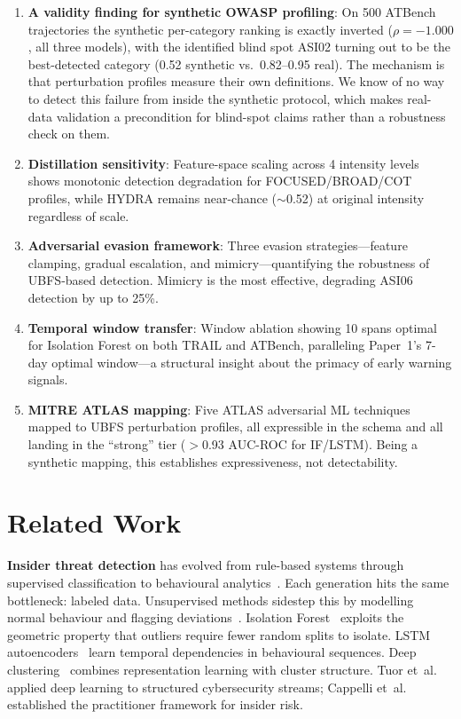 \documentclass[conference]{IEEEtran}
\begin{document}
\begin{enumerate}
    \item \textbf{A validity finding for synthetic OWASP profiling}: On 500 ATBench trajectories the synthetic per-category ranking is exactly inverted ($\rho = -1.000$, all three models), with the identified blind spot ASI02 turning out to be the best-detected category (0.52 synthetic vs.\ 0.82--0.95 real). The mechanism is that perturbation profiles measure their own definitions. We know of no way to detect this failure from inside the synthetic protocol, which makes real-data validation a precondition for blind-spot claims rather than a robustness check on them.
    \item \textbf{Distillation sensitivity}: Feature-space scaling across 4 intensity levels shows monotonic detection degradation for FOCUSED/BROAD/COT profiles, while HYDRA remains near-chance (${\sim}$0.52) at original intensity regardless of scale.
    \item \textbf{Adversarial evasion framework}: Three evasion strategies---feature clamping, gradual escalation, and mimicry---quantifying the robustness of UBFS-based detection. Mimicry is the most effective, degrading ASI06 detection by up to 25\%.
    \item \textbf{Temporal window transfer}: Window ablation showing 10 spans optimal for Isolation Forest on both TRAIL and ATBench, paralleling Paper~1's 7-day optimal window---a structural insight about the primacy of early warning signals.
    \item \textbf{MITRE ATLAS mapping}: Five ATLAS adversarial ML techniques mapped to UBFS perturbation profiles, all expressible in the schema and all landing in the ``strong'' tier ($>$0.93 AUC-ROC for IF/LSTM). Being a synthetic mapping, this establishes expressiveness, not detectability.
\end{enumerate}

\section{Related Work}
\label{sec:related}

\textbf{Insider threat detection} has evolved from rule-based systems through supervised classification to behavioural analytics~\cite{salem2008survey, homoliak2019insight}. Each generation hits the same bottleneck: labeled data. Unsupervised methods sidestep this by modelling normal behaviour and flagging deviations~\cite{chalapathy2019deep}. Isolation Forest~\cite{liu2008isolation} exploits the geometric property that outliers require fewer random splits to isolate. LSTM autoencoders~\cite{malhotra2016lstm} learn temporal dependencies in behavioural sequences. Deep clustering~\cite{xie2024deep} combines representation learning with cluster structure. Tuor et~al.~\cite{tuor2017deep} applied deep learning to structured cybersecurity streams; Cappelli et~al.~\cite{cappelli2012cert} established the practitioner framework for insider risk.
\end{document}
